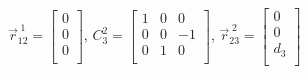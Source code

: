 {    \qquad \qquad \qquad \qquad \quad
    $\vec{r}^{\;1}_{12} =
        \begin{bmatrix}
            0 \\
            0 \\
            0 \\
        \end{bmatrix}$,
    $C_3^2 =
        \begin{bmatrix}
            1 & 0 & 0  \\
            0 & 0 & -1 \\
            0 & 1 & 0  \\
        \end{bmatrix}
    $,\quad
    $\vec{r}^{\;2}_{23} =
        \begin{bmatrix}
            0   \\
            0   \\
            d_3 \\
        \end{bmatrix}
    $
}

